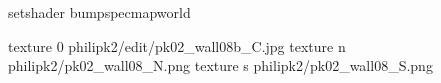setshader bumpspecmapworld

texture 0 philipk2/edit/pk02_wall08b_C.jpg
texture n philipk2/pk02_wall08_N.png
texture s philipk2/pk02_wall08_S.png

